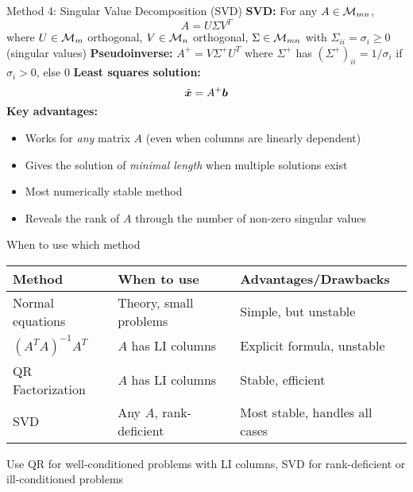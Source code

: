 \documentclass[aspectratio=169]{beamer}\usepackage[]{graphicx}\usepackage[]{xcolor}
\begin{document}
\begin{frame}{Method 4: Singular Value Decomposition (SVD)}
\textbf{SVD:} For any $A\in\mathcal{M}_{mn}$,
$$A = U\Sigma V^T$$
where $U\in\mathcal{M}_m$ orthogonal, $V\in\mathcal{M}_n$ orthogonal, $\Sigma\in\mathcal{M}_{mn}$ with $\Sigma_{ii} = \sigma_i \geq 0$ (singular values)
\vfill
\textbf{Pseudoinverse:} $A^+ = V\Sigma^+ U^T$ where $\Sigma^+$ has $(\Sigma^+)_{ii} = 1/\sigma_i$ if $\sigma_i > 0$, else $0$
\vfill
\textbf{Least squares solution:}
$$\tilde{\bm{x}} = A^+\bm{b}$$
\vfill
\textbf{Key advantages:}
\begin{itemize}
\item Works for \emph{any} matrix $A$ (even when columns are linearly dependent)
\item Gives the solution of \emph{minimal length} when multiple solutions exist
\item Most numerically stable method
\item Reveals the rank of $A$ through the number of non-zero singular values
\end{itemize}
\end{frame}

\begin{frame}{When to use which method}
\begin{center}
\begin{tabular}{|l|l|l|}
\hline
\textbf{Method} & \textbf{When to use} & \textbf{Advantages/Drawbacks} \\
\hline
Normal equations & Theory, small problems & Simple, but unstable \\
\hline
$(A^TA)^{-1}A^T$ & $A$ has LI columns & Explicit formula, unstable \\
\hline
QR Factorization & $A$ has LI columns & Stable, efficient \\
\hline
SVD & Any $A$, rank-deficient & Most stable, handles all cases \\
\hline
\end{tabular}
\end{center}
\vfill
Use QR for well-conditioned problems with LI columns, SVD for rank-deficient or ill-conditioned problems
\end{frame}





\end{document}
